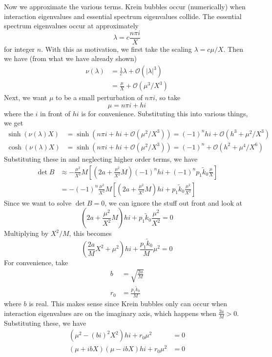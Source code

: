 \documentclass[thesis.tex]{subfiles}
\begin{document}
Now we approximate the various terms. Krein bubbles occur (numerically) when interaction eigenvalues and essential spectrum eigenvalues collide. The essential spectrum eigenvalues occur at approximately 
\[
\lambda = c \frac{n \pi i}{X}
\]
for integer $n$. With this as motivation, we first take the scaling $\lambda = c \mu / X$. Then we have (from what we have already shown)
\begin{align*}
\nu(\lambda) &= \frac{1}{c} \lambda + \mathcal{O}(|\lambda|^3) 
\\
&= \frac{\mu}{X} + \mathcal{O}(\mu^3 / X^3)
\end{align*}
Next, we want $\mu$ to be a small perturbation of $n \pi i$, so take 
\[
\mu = n \pi i + h i
\]
where the $i$ in front of $h i$ is for convenience. Substituting this into various things, we get
\begin{align*}
\sinh(\nu(\lambda)X) &= \sinh(n \pi i + h i + \mathcal{O}(\mu^2 / X^3)) = (-1)^n h i  + \mathcal{O}(h^3 + \mu^2 / X^3) \\
\cosh(\nu(\lambda)X) &= \sinh(n \pi i + h i + \mathcal{O}(\mu^2 / X^3)) = (-1)^n +  \mathcal{O}(h^2 + \mu^4 / X^6)
\end{align*}
Substituting these in and neglecting higher order terms, we have
\begin{align*}
\det B &\approx -\frac{\mu^2}{X^2} M \left[ \left(2a + \frac{\mu^2}{X^2} M\right)(-1)^n h i + (-1)^n p_1 \tilde{k}_0 \frac{\mu}{X} \right] \\
&= -(-1)^n \frac{\mu^2}{X^2} M \left[ \left(2a + \frac{\mu^2}{X^2} M\right) h i + p_1 \tilde{k}_0 \frac{\mu^2}{X^2} \right] 
\end{align*}
Since we want to solve $\det B = 0$, we can ignore the stuff out front and look at 
\[
\left(2a + \frac{\mu^2}{X^2} M\right) h i + p_1 \tilde{k}_0 \frac{\mu^2}{X^2} = 0
\]
Multiplying by $X^2/M$, this becomes
\[
\left(\frac{2a}{M} X^2 + \mu^2 \right) h i + \frac{ p_1 \tilde{k}_0 }{M}\mu^2 = 0
\]
For convenience, take
\begin{align*}
b &= \sqrt{ \frac{2a}{M} } \\
r_0 &= \frac{ p_1 \tilde{k}_0 }{M}
\end{align*}
where $b$ is real. This makes sense since Krein bubbles only can occur when interaction eigenvalues are on the imaginary axis, which happens when $\frac{2a}{M} > 0$. Substituting these, we have
\begin{align*}
\left(\mu^2 - (bi)^2 X^2 \right) h i + r_0 \mu^2 &= 0 \\
(\mu + i bX)(\mu - i bX) h i + r_0 \mu^2 &= 0
\end{align*}
\end{document}
